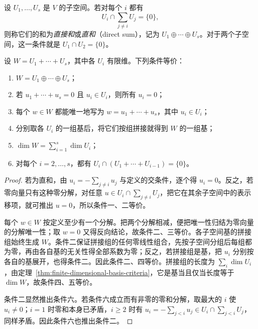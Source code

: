 \begin{definition}
\label{def:direct-sum}
设 $U_1,\ldots,U_s$ 是 $V$ 的子空间。若对每个 $i$ 都有
\begin{equation}
\label{eq:direct-sum-intersection-condition}
    U_i\cap\sum_{j\ne i}U_j=\{0\},
\end{equation}
则称它们的和为\emph{直接和}或\emph{直和}（direct sum），记为 $U_1\oplus\cdots\oplus U_s$。对于两个子空间，这一条件就是 $U_1\cap U_2=\{0\}$。
\end{definition}

\begin{theorem}
\label{thm:direct-sum-equivalences}
设 $W=U_1+\cdots+U_s$，其中各 $U_i$ 有限维。下列条件等价：
\begin{enumerate}
    \item $W=U_1\oplus\cdots\oplus U_s$；
    \item 若 $u_1+\cdots+u_s=0$ 且 $u_i\in U_i$，则所有 $u_i=0$；
    \item 每个 $w\in W$ 都能唯一地写为 $w=u_1+\cdots+u_s$，其中 $u_i\in U_i$；
    \item 分别取各 $U_i$ 的一组基后，将它们按组拼接就得到 $W$ 的一组基；
    \item $\dim W=\sum_{i=1}^s\dim U_i$；
    \item 对每个 $i=2,\ldots,s$，都有 $U_i\cap(U_1+\cdots+U_{i-1})=\{0\}$。
\end{enumerate}
\end{theorem}

\begin{proof}
若为直和，由 $u_i=-\sum_{j\ne i}u_j$ 与定义的交条件，逐个得 $u_i=0$。反之，若零向量只有这种零分解，对任意 $u\in U_i\cap\sum_{j\ne i}U_j$，把它在其余子空间中的表示移项，就可推出 $u=0$，所以条件一、二等价。

每个 $w\in W$ 按定义至少有一个分解。把两个分解相减，便把唯一性归结为零向量的分解唯一性；取 $w=0$ 又得反向结论，故条件二、三等价。各子空间基的拼接组始终生成 $W$。条件二保证拼接组的任何零线性组合，先按子空间分组后每组都为零，再由各自基的无关性得全部系数为零；反之，若拼接组是基，把 $u_i$ 分别按各自的基展开，也得条件二。因此条件二、四等价。拼接组的长度为 $\sum_i\dim U_i$，由定理~\ref{thm:finite-dimensional-basis-criteria}，它是基当且仅当长度等于 $\dim W$，故条件四、五等价。

条件二显然推出条件六。若条件六成立而有非零的零和分解，取最大的 $i$ 使 $u_i\ne0$；$i=1$ 时零和本身已矛盾，$i\geq2$ 时有 $u_i=-\sum_{j<i}u_j\in U_i\cap\sum_{j<i}U_j$，同样矛盾。因此条件六也推出条件二。
\end{proof}

